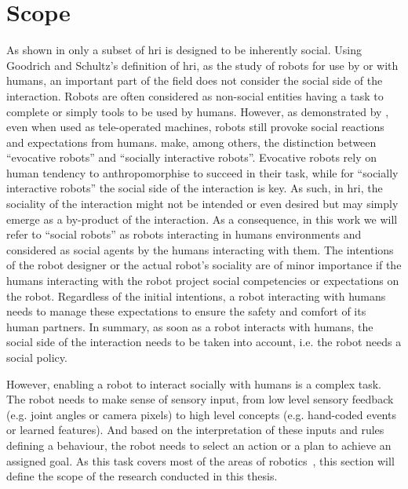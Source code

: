\section{Scope}\label{sec:intro_scope}

As shown in \cite{goodrich2007human} only a subset of \gls{hri} is designed to be inherently social. Using Goodrich and Schultz's definition of \gls{hri}, as the study of robots for use by or with humans, an important part of the field does not consider the social side of the interaction. Robots are often considered as non-social entities having a task to complete or simply tools to be used by humans. However, as demonstrated by \cite{fincannon2004evidence}, even when used as tele-operated machines, robots still provoke social reactions and expectations from humans. \cite{fong2003survey} make, among others, the distinction between ``evocative robots'' and ``socially interactive robots''. Evocative robots rely on human tendency to anthropomorphise to succeed in their task, while for ``socially interactive robots'' the social side of the interaction is key. As such, in \gls{hri}, the sociality of the interaction might not be intended or even desired but may simply emerge as a by-product of the interaction. As a consequence, in this work we will refer to ``social robots'' as robots interacting in humans environments and considered as social agents by the humans interacting with them. The intentions of the robot designer or the actual robot's sociality are of minor importance if the humans interacting with the robot project social competencies or expectations on the robot. Regardless of the initial intentions, a robot interacting with humans needs to manage these expectations to ensure the safety and comfort of its human partners. In summary, as soon as a robot interacts with humans, the social side of the interaction needs to be taken into account, i.e. the robot needs a social policy. 

However, enabling a robot to interact socially with humans is a complex task. The robot needs to make sense of sensory input, from low level sensory feedback (e.g. joint angles or camera pixels) to high level concepts (e.g. hand-coded events or learned features). And based on the interpretation of these inputs and rules defining a behaviour, the robot needs to select an action or a plan to achieve an assigned goal. As this task covers most of the areas of robotics~\citep{fong2003survey}, this section will define the scope of the research conducted in this thesis.

